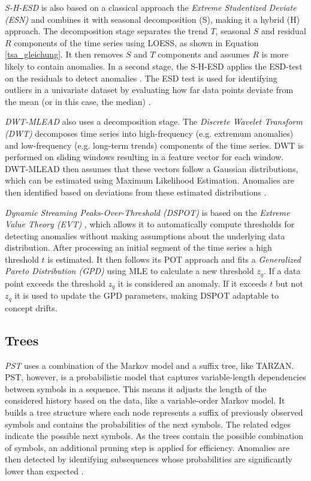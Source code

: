 \textit{S-H-ESD} is also based on a classical approach the \textit{Extreme Studentized Deviate (ESN)} \cite{Nair1948} and combines it with seasonal decomposition (S), making it a hybrid (H) approach. The decomposition stage separates the trend $T$, seasonal $S$ and residual $R$ components of the time series using LOESS, as shown in Equation \ref{tsa_gleichung}. It then removes $S$ and $T$ components and assumes $R$ is more likely to contain anomalies. In a second stage, the S-H-ESD applies the ESD-test on the residuals to detect anomalies \cite{S-H-ESD}. The ESD test is used for identifying outliers in a univariate dataset by evaluating how far data points deviate from the mean (or in this case, the median) \cite{Nair1948}.

\textit{DWT-MLEAD} also uses a decomposition stage. The \textit{Discrete Wavelet Transform (DWT)} decomposes time series into high-frequency (e.g. extremum anomalies) and low-frequency (e.g. long-term trends) components of the time series. DWT is performed on sliding windows resulting in a feature vector for each window. DWT-MLEAD then assumes that these vectors follow a Gaussian distributions, which can be estimated using Maximum Likelihood Estimation. Anomalies are then identified based on deviations from these estimated distributions \cite{DWT-MLEAD}.

\textit{Dynamic Streaming Peaks-Over-Threshold (DSPOT)} is based on the \textit{Extreme Value Theory (EVT)} \cite{Haan2006}, which allows it to automatically compute thresholds for detecting anomalies without making assumptions about the underlying data distribution. After processing an initial segment of the time series a high threshold $t$ is estimated. It then follows its POT approach and fits a \textit{Generalized Pareto Distribution (GPD)} using MLE to calculate a new threshold $z_q$. If a data point exceeds the threshold $z_q$ it is considered an anomaly. If it exceeds $t$ but not $z_q$ it is used to update the GPD parameters, making DSPOT adaptable to concept drifts.

\subsection{Trees}
\textit{PST} uses a combination of the Markov model and a suffix tree, like TARZAN. PST, however, is a probabilistic model that captures variable-length dependencies between symbols in a sequence. This means it adjusts the length of the considered history based on the data, like a variable-order Markov model. It builds a tree structure where each node represents a suffix of previously observed symbols and contains the probabilities of the next symbols. The related edges indicate the possible next symbols. As the trees contain the possible combination of symbols, an additional pruning step is applied for efficiency. Anomalies are then detected by identifying subsequences whose probabilities are significantly lower than expected \cite{PST}.

